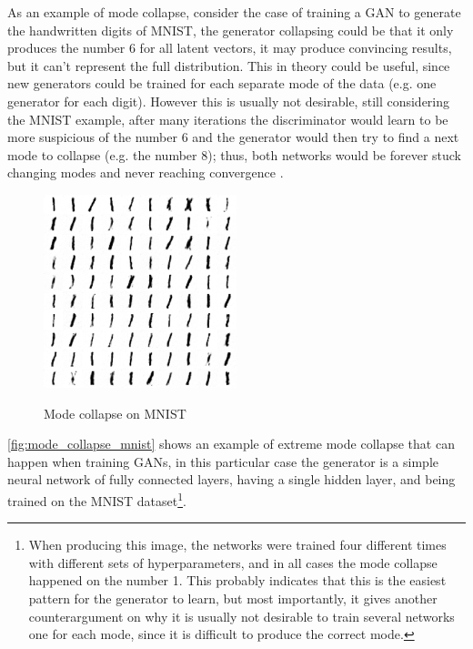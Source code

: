 As an example of mode collapse, consider the case of training a \gls{GAN} to generate the handwritten digits of \gls{MNIST}, the generator collapsing could be that it only produces the number $6$ for all latent vectors, it may produce convincing results, but it can't represent the full distribution. This in theory could be useful, since new generators could be trained for each separate mode of the data (e.g. one generator for each digit). However this is usually not desirable, still considering the \gls{MNIST} example, after many iterations the discriminator would learn to be more suspicious of the number $6$ and the generator would then try to find a next mode to collapse (e.g. the number $8$); thus, both networks would be forever stuck changing modes and never reaching convergence \cite{improvedGANS2016}.
\begin{figure}[hbt]
    \centering
    \caption{Mode collapse on \gls{MNIST}}
    \includegraphics[width=0.5\textwidth]{chapters/GANs/figures/mode-collapse.png}
    \label{fig:mode_collapse_mnist}
\end{figure}

\autoref{fig:mode_collapse_mnist} shows an example of extreme mode collapse that can happen when training \acp{GAN}, in this particular case the generator is a simple neural network of fully connected layers, having a single hidden layer, and being trained on the \gls{MNIST} dataset\footnote{
    When producing this image, the networks were trained four different times with different sets of hyperparameters, and in all cases the mode collapse happened on the number 1. This probably indicates that this is the easiest pattern for the generator to learn, but most importantly, it gives another counterargument on why it is usually not desirable to train several networks one for each mode, since it is difficult to produce the correct mode.
}.


